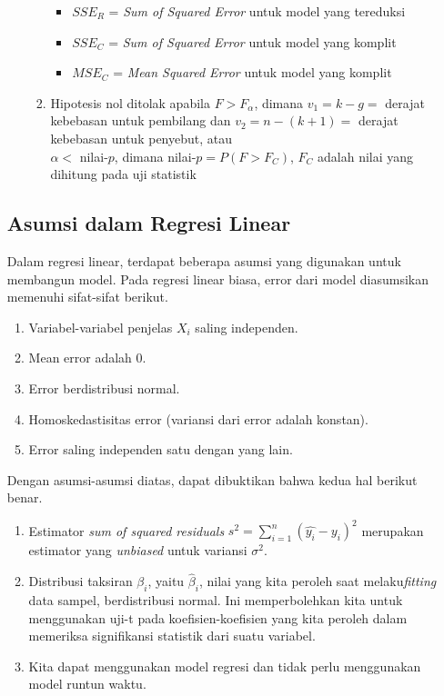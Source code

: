 \begin{enumerate}
\begin{enumerate}
\begin{enumerate}
        \begin{itemize}
            \item $SSE_R$ = \textit{Sum of Squared Error} untuk model yang tereduksi
            \item $SSE_C$ = \textit{Sum of Squared Error} untuk model yang komplit
            \item $MSE_C$ = \textit{Mean Squared Error} untuk model yang komplit
        \end{itemize}
        \item Hipotesis nol ditolak apabila $F > F_{\alpha}$, dimana $v_1 = k - g = $ derajat kebebasan untuk pembilang dan $v_2 = n - (k + 1) = $ derajat kebebasan untuk penyebut, atau \\
        $\alpha <$ nilai-$p$, dimana nilai-$p = P(F > F_C)$, $F_C$ adalah nilai yang dihitung pada uji statistik
    \end{enumerate} %
\end{enumerate}
\subsection{Asumsi dalam Regresi Linear}
Dalam regresi linear, terdapat beberapa asumsi yang digunakan untuk membangun model. Pada regresi linear biasa, error dari model diasumsikan memenuhi sifat-sifat berikut.
\begin{enumerate}
    \item Variabel-variabel penjelas $X_i$ saling independen.
    \item Mean error adalah 0.
    \item Error berdistribusi normal.
    \item Homoskedastisitas error (variansi dari error adalah konstan).
    \item Error saling independen satu dengan yang lain.
\end{enumerate}
Dengan asumsi-asumsi diatas, dapat dibuktikan bahwa kedua hal berikut benar.
\begin{enumerate}
    \item Estimator \textit{sum of squared residuals} $s^2=\sum_{i=1}^n(\hat{y_i}-y_i)^2$ merupakan estimator yang \textit{unbiased} untuk variansi $\sigma^2$.
    \item Distribusi taksiran $\beta_i$, yaitu $\hat{\beta}_i$, nilai yang kita peroleh saat melaku\textit{fitting} data sampel, berdistribusi normal. Ini memperbolehkan kita untuk menggunakan uji-t pada koefisien-koefisien yang kita peroleh dalam memeriksa signifikansi statistik dari suatu variabel.
    \item Kita dapat menggunakan model regresi dan tidak perlu menggunakan model runtun waktu.
\end{enumerate}

\end{enumerate}
